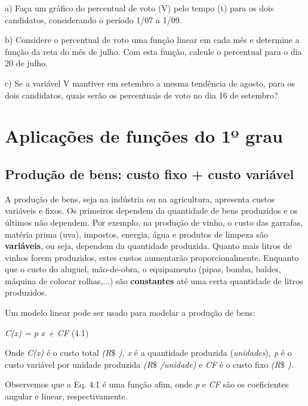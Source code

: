 \begin{exercicios}
\begin{table}[H]
\begin{tabular}{p{0.26in}p{0.73in}p{0.83in}p{0.83in}}
\end{tabular}
 \end{table}

a) Faça um gráfico do percentual de voto (V) pelo tempo (t) para os dois candidatos, considerando o período 1/07 a 1/09.

b) Considere o percentual de voto uma função linear em cada mês e determine a função da reta do mês de julho. Com esta função, calcule o percentual para o dia 20 de julho.

c) Se a variável V mantiver em setembro a mesma tendência de agosto, para os dois candidatos, quais serão os percentuais de voto no dia 16 de setembro?
\end{exercicios}

\section{Aplicações de funções do 1º grau }

\subsection{Produção de bens: custo fixo + custo variável}

A produção de bens, seja na indústria ou na agricultura, apresenta custos variáveis e fixos. Os primeiros dependem da quantidade de bens produzidos e os últimos não dependem. Por exemplo, na produção de vinho, o custo das garrafas, matéria prima (uva), impostos, energia, água e produtos de limpeza são \textbf{variáveis}, ou seja, dependem da quantidade produzida. Quanto mais litros de vinhos forem produzidos, estes custos aumentarão proporcionalmente. Enquanto que o custo do aluguel, mão-de-obra, o equipamento (pipas, bomba, baldes, máquina de colocar rolhas,...) são \textbf{constantes} até uma certa quantidade de litros produzidos. 

Um modelo linear pode ser usado para modelar a produção de bens:

\begin{FlushRight}
\textit{\tab C(x) = p} \textit{x + CF} \tab (4.1)
\end{FlushRight}

Onde \textit{C(x) }é o custo total\textit{ (R$\$$ ), x }é a quantidade produzida (\textit{unidades})\textit{, p }é o custo variável por unidade produzida\textit{ (R$\$$ /unidade) }e\textit{ CF }é o custo fixo\textit{ (R$\$$ ).}

Observemos que a Eq. 4.1 é uma função afim, onde \textit{p} e \textit{CF} são os coeficientes angular e linear, respectivamente.

